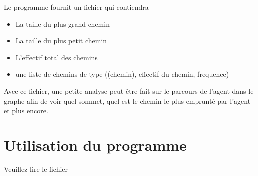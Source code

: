 \documentclass[a4paper, 11pt, oneside]{article}
\begin{document}
			Le programme fournit un fichier  qui contiendra 
			
			\begin{itemize}
				\item La taille du plus grand chemin
				\item La taille du plus petit chemin
				\item L'effectif total des chemins
				\item une liste de chemins de type ((chemin), effectif du chemin, frequence)
			\end{itemize}
		
		Avec ce fichier, une petite analyse peut-être fait sur le parcours de l'agent dans le graphe afin de voir quel sommet, quel est le chemin le plus emprunté par l'agent et plus encore.
		\section{Utilisation du programme}
			Veuillez lire le fichier 
\printbibliography
\end{document}
